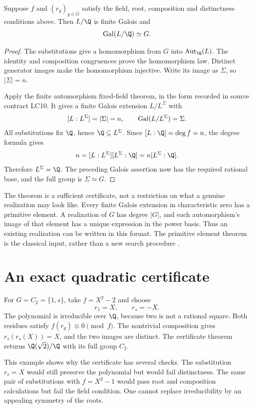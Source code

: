 \begin{theorem}
\label{thm:g07-certificate}
Suppose $f$ and $(r_g)_{g\in G}$ satisfy the field, root, composition and distinctness conditions above. Then $L/\Q$ is finite Galois and
\[
 \Gal(L/\Q)\simeq G.
\]
\end{theorem}

\begin{proof}
The substitutions give a homomorphism from $G$ into $\Aut_{\Q}(L)$. The identity and composition congruences prove the homomorphism law. Distinct generator images make the homomorphism injective. Write its image as $\Sigma$, so $|\Sigma|=n$.

Apply the finite automorphism fixed-field theorem, in the form recorded in source contract LC10. It gives a finite Galois extension $L/L^\Sigma$ with
\[
 [L:L^\Sigma]=|\Sigma|=n,
 \qquad \operatorname{Gal}(L/L^\Sigma)=\Sigma.
\]
All substitutions fix $\Q$, hence $\Q\subseteq L^\Sigma$. Since $[L:\Q]=\deg f=n$, the degree formula gives
\[
 n=[L:L^\Sigma][L^\Sigma:\Q]
   =n[L^\Sigma:\Q].
\]
Therefore $L^\Sigma=\Q$. The preceding Galois assertion now has the required rational base, and the full group is $\Sigma\simeq G$.
\end{proof}

The theorem is a sufficient certificate, not a restriction on what a genuine realization may look like. Every finite Galois extension in characteristic zero has a primitive element. A realization of $G$ has degree $|G|$, and each automorphism's image of that element has a unique expression in the power basis. Thus an existing realization can be written in this format. The primitive element theorem is the classical input, rather than a new search procedure \cite[Theorem 5.1]{Milne2022}.

\section{An exact quadratic certificate}

For $G=C_2=\{1,s\}$, take $f=X^2-2$ and choose
\[
 r_1=X,\qquad r_s=-X.
\]
The polynomial is irreducible over $\Q$, because two is not a rational square. Both residues satisfy $f(r_g)\equiv0\pmod f$. The nontrivial composition gives $r_s(r_s(X))=X$, and the two images are distinct. The certificate theorem returns $\Q(\sqrt2)/\Q$ with its full group $C_2$.

This example shows why the certificate has several checks. The substitution $r_s=X$ would still preserve the polynomial but would fail distinctness. The same pair of substitutions with $f=X^2-1$ would pass root and composition calculations but fail the field condition. One cannot replace irreducibility by an appealing symmetry of the roots.

